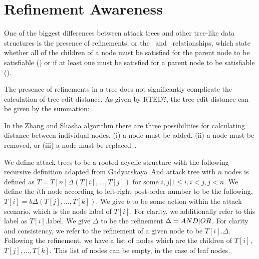 \section{Refinement Awareness}

One of the biggest differences between attack trees and other tree-like data structures is the presence of refinements, or the \AND\ and \OR\ relationships, which state whether all of the children of a node must be satisfied for the parent node to be satisfiable (\AND) or if at least one must be satisfied for a parent node to be satisfiable (\OR).

The presence of refinements in a tree does not significantly complicate the calculation of tree edit distance. As given by RTED?, the tree edit distance can be given by the summation: .

In the Zhang and Shasha algorithm there are three possibilities for calculating distance between individual nodes, (i) a node must be added, (ii) a node must be removed, or (iii) a node must be replaced~\cite{zhang_simple_1989}.



\begin{definition} \label{def:attack-tree} We define attack trees to be a rooted acyclic structure with the following recursive definition adapted from Gadyatskaya~\etal\. And attack tree with $n$ nodes is defined as $T = T[n]\Delta(T[i],...,T[j])$ for some $i,j|1 \le i, i < j, j < n$. We define the $i\text{th}$ node according to left-right post-order number to be the following, $T[i] = b\Delta(T[j],...,T[k])$. We give $b$ to be some action within the attack scenario, which is the node label of $T[i]$. For clarity, we additionally refer to this label as $T[i].\text{label}$. We give $\Delta$ to be the refinement $\Delta = AND|OR$. For clarity and consistency, we refer to the refinement of a given node to be $T[i].\Delta$. Following the refinement, we have a list of nodes which are the children of $T[i]$, $T[j],...,T[k]$. This list of nodes can be empty, in the case of leaf nodes.
\end{definition}
      


